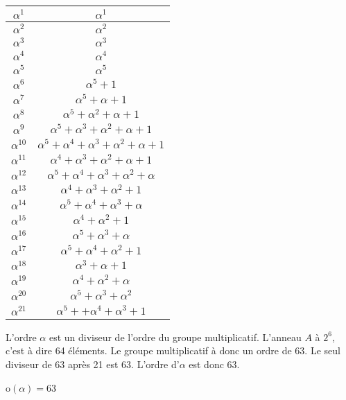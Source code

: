\documentclass[a4paper,10pt]{article}
\begin{document}
\begin{enumerate}
\begin{center}
\begin{tabular}{|c|c|}
	\hline 	
	$\alpha^1$ & $\alpha^1$\\
	\hline 	
	$\alpha^2$ & $\alpha^2$\\
	\hline 	
	$\alpha^3$ & $\alpha^3$\\
	\hline 	
	$\alpha^4$ & $\alpha^4$\\
	\hline 	
	$\alpha^5$ & $\alpha^5$\\
	\hline 	
	$\alpha^6$ & $\alpha^5+1 $\\
	\hline 	
	$\alpha^7$ & $ \alpha^5+\alpha+1$\\
	\hline 	
	$\alpha^8$ &$\alpha^5+\alpha^2+\alpha+1 $ \\
	\hline 	
	$\alpha^9$ & $ \alpha^5+\alpha^3+\alpha^2+\alpha+1$\\
	\hline 	
	$\alpha^{10}$ & $ \alpha^5+\alpha^4+\alpha^3+\alpha^2+\alpha+1$\\
	\hline 	
	$\alpha^{11}$ & $\alpha^4+\alpha^3+\alpha^2+\alpha+1$\\
	\hline 	
	$\alpha^{12}$ & $ \alpha^5+\alpha^4+\alpha^3+\alpha^2+\alpha$\\
	\hline 	
	$\alpha^{13}$ & $ \alpha^4+\alpha^3+\alpha^2+1$\\
	\hline 	
	$\alpha^{14}$ & $ \alpha^5+\alpha^4+\alpha^3+\alpha$\\
	\hline 	
	$\alpha^{15}$ & $\alpha^4+\alpha^2+1 $\\
	\hline 	
	$\alpha^{16}$ & $ \alpha^5+\alpha^3+\alpha$\\
	\hline 	
	$\alpha^{17}$ & $ \alpha^5+\alpha^4+\alpha^2+1$\\
	\hline 	
	$\alpha^{18}$ & $\alpha^3+\alpha+1 $\\
	\hline 	
	$\alpha^{19}$ & $ \alpha^4+\alpha^2+\alpha$\\
	\hline 	
	$\alpha^{20}$ & $ \alpha^5+\alpha^3+\alpha^2$\\
	\hline 	
	$\alpha^{21}$ & $\alpha^5++\alpha^4+\alpha^3+1 $\\
	\hline
\end{tabular}
\end{center}

L'ordre $\alpha$ est un diviseur de l'ordre du groupe multiplicatif. L'anneau $A$ à $2^6$, c'est à dire 64 éléments. Le groupe multiplicatif à donc un ordre de 63. Le seul diviseur de 63 après 21 est 63. L'ordre d'$\alpha$ est donc 63.

\begin{center}
o$(\alpha)=63$
\end{center}


\end{enumerate}
\end{document}
